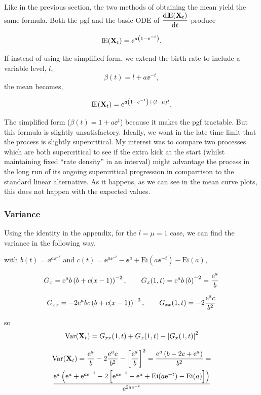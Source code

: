 Like in the previous section, the two methods of obtaining the mean yield the same formula. Both the pgf and the basic ODE of $\displaystyle\frac{{\rm d} {\rm I}\!{\rm E}({{\bf X}_t})}{{\rm d} t}$ produce

$${\rm I}\!{\rm E}({{\bf X}_t}) = {\rm e}^{a\left(1 - {\rm e}^{-t}\right)}.$$


If instead of using the simplified form, we extend the birth rate to include a variable level, $l$,
$$\beta(t) = l + a\ee^{-t},$$
the mean becomes,

$${\rm I}\!{\rm E}({{\bf X}_t}) = {\rm e}^{a\left(1 - {\rm e}^{-t}\right) + (l - \mu)t}.$$

The simplified form ($\beta(t) = 1 + a\ee^t$) because it makes the pgf tractable. But this formula is slightly unsatisfactory. Ideally, we want in the late time limit that the process is slightly supercritical. My interest was to compare two processes which are both supercritical to see if the extra kick at the start (whilst maintaining fixed ``rate density'' in an interval) might advantage the process in the long run of its ongoing supercritical progression in comparrison to the standard linear alternative. As it happens, as we can see in the mean curve plots, this does not happen with the expected values.  




\subsubsection{Variance}



Using the identity in the appendix, for the $l=\mu=1$ case, we can find the variance in the following way. 

with $b(t) = \ee^{a\ee^{-t}}$ and $c(t) = \ee^{a \ee^{-t}} - \ee^a + \text{Ei}(a\ee^{-t})    - \text{Ei}(a)  $, 

$$G_x =  {\rm e}^a b\left( b+c(x-1)\right)^{-2}, \qquad G_x(1,t) = {\rm e}^a b\left( b\right)^{-2}  = \frac{{\rm e}^a}{b}$$

$$G_{xx} =  -2 {\rm e}^a bc\left( b+c(x-1)\right)^{-3}, \qquad G_{xx}(1, t) =  -2 \frac{ {\rm e}^a  c}{b^2}$$

so 
$$\text{Var}({{\bf X}_t}) = G_{xx}(1,t) + G_{x}(1,t) - \left[ G_x(1,t)\right]^2$$

\begin{multline}
\text{Var}({{\bf X}_t}) = \frac{{\rm e}^a}{b}  -2 \frac{ {\rm e}^a  c}{b^2} - \left[ \frac{{\rm e}^a}{b}\right]^2 = \frac{{\rm e}^a\left( b - 2c + {\rm e}^a\right)}{b^2} = \\ \frac{{\rm e}^a\left( {\rm e}^a +  {\rm e}^{a{\rm e}^{-t}} - 2\left[   {\rm e}^{a {\rm e}^{-t}} - {\rm e}^a + \text{Ei}(a{\rm e}^{-t})    - \text{Ei}(a)    \right] \right)}{{\rm e}^{2a{\rm e}^{-t}}} 
\end{multline}




